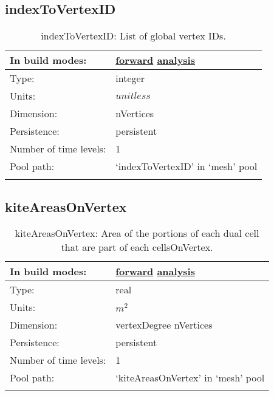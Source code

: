 \subsection[indexToVertexID]{indexToVertexID}
\label{subsec:var_sec_mesh_indexToVertexID}
\begin{center}
\begin{longtable}{| p{2.0in} | p{4.0in} |}
        \hline 
        In build modes: & \hyperref[subsec:forward_var_tab_mesh]{forward} \hyperref[subsec:analysis_var_tab_mesh]{analysis} \\
        \hline 
        Type: & integer \\
        \hline 
        Units: & $unitless$ \\
        \hline 
        Dimension: & nVertices \\
        \hline 
        Persistence: & persistent \\
        \hline 
        Number of time levels: & 1 \\
        \hline 
            Pool path: & `indexToVertexID' in `mesh' pool \\
		 \hline 
    \caption{indexToVertexID: List of global vertex IDs.}
\end{longtable}
\end{center}
\subsection[kiteAreasOnVertex]{kiteAreasOnVertex}
\label{subsec:var_sec_mesh_kiteAreasOnVertex}
\begin{center}
\begin{longtable}{| p{2.0in} | p{4.0in} |}
        \hline 
        In build modes: & \hyperref[subsec:forward_var_tab_mesh]{forward} \hyperref[subsec:analysis_var_tab_mesh]{analysis} \\
        \hline 
        Type: & real \\
        \hline 
        Units: & $m^2$ \\
        \hline 
        Dimension: & vertexDegree nVertices \\
        \hline 
        Persistence: & persistent \\
        \hline 
        Number of time levels: & 1 \\
        \hline 
            Pool path: & `kiteAreasOnVertex' in `mesh' pool \\
		 \hline 
    \caption{kiteAreasOnVertex: Area of the portions of each dual cell that are part of each cellsOnVertex.}
\end{longtable}
\end{center}
